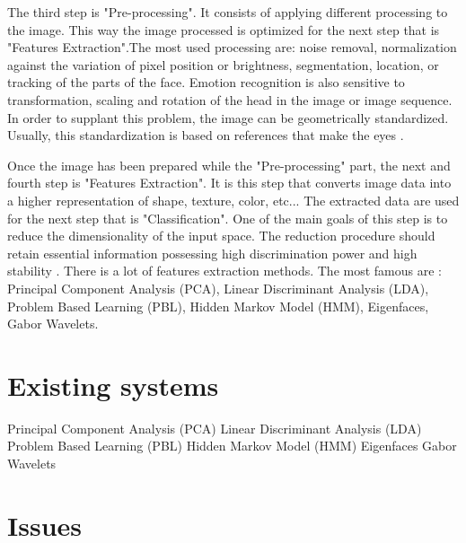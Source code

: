 \noindent The third step is "Pre-processing". It consists of applying different processing to the image. This way the image processed is optimized for the next step that is "Features Extraction".The most used processing are: noise removal, normalization against the variation of pixel position or brightness, segmentation, location, or tracking of the parts of the face. Emotion recognition is also sensitive to transformation, scaling and rotation of the head in the image or image sequence. In order to supplant this problem, the image can be geometrically standardized. Usually, this standardization is based on references that make the eyes \cite{CHI03}.
\newline

\noindent Once the image has been prepared while the "Pre-processing" part, the next and fourth step is "Features Extraction". It is this step that converts image data into a higher representation of shape, texture, color, etc... The extracted data are used for the next step that is "Classification". One of the main goals of this step is to reduce the dimensionality of the input space. The reduction procedure should retain essential information possessing high discrimination power and high stability \cite{CHI03}. There is a lot of features extraction methods. The most famous are : Principal Component Analysis (PCA), Linear Discriminant Analysis (LDA), Problem Based Learning (PBL), Hidden Markov Model (HMM), Eigenfaces, Gabor Wavelets.
\newline

\section{Existing systems}

\noindent Principal Component Analysis (PCA)
\newline
\noindent Linear Discriminant Analysis (LDA)
\newline
\noindent Problem Based Learning (PBL)
\newline
\noindent Hidden Markov Model (HMM)
\newline
\noindent Eigenfaces
\newline
\noindent Gabor Wavelets
\newline

\section{Issues}

